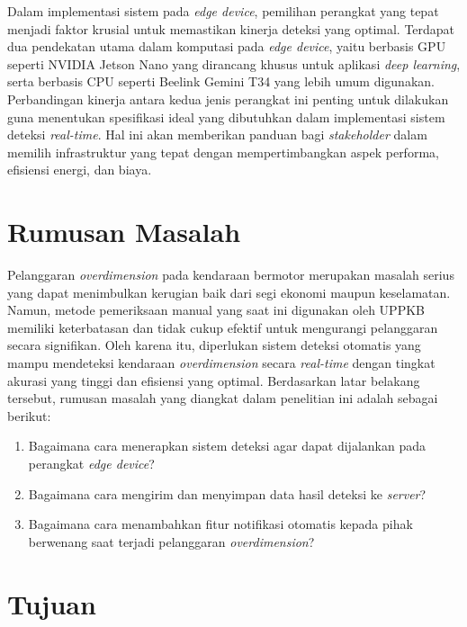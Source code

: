 Dalam implementasi sistem pada \emph{edge device}, pemilihan perangkat yang tepat menjadi faktor krusial untuk memastikan kinerja deteksi yang optimal. Terdapat dua pendekatan utama dalam komputasi pada \emph{edge device}, yaitu berbasis GPU seperti NVIDIA Jetson Nano yang dirancang khusus untuk aplikasi \emph{deep learning}, serta berbasis CPU seperti Beelink Gemini T34 yang lebih umum digunakan. Perbandingan kinerja antara kedua jenis perangkat ini penting untuk dilakukan guna menentukan spesifikasi ideal yang dibutuhkan dalam implementasi sistem deteksi \emph{real-time}. Hal ini akan memberikan panduan bagi \emph{stakeholder} dalam memilih infrastruktur yang tepat dengan mempertimbangkan aspek performa, efisiensi energi, dan biaya.

\section{Rumusan Masalah}
\label{sec:rumusanmasalah}

Pelanggaran \emph{overdimension} pada kendaraan bermotor merupakan masalah serius yang dapat menimbulkan kerugian baik dari segi ekonomi maupun keselamatan. Namun, metode pemeriksaan manual yang saat ini digunakan oleh UPPKB memiliki keterbatasan dan tidak cukup efektif untuk mengurangi pelanggaran secara signifikan. Oleh karena itu, diperlukan sistem deteksi otomatis yang mampu mendeteksi kendaraan \emph{overdimension} secara \emph{real-time} dengan tingkat akurasi yang tinggi dan efisiensi yang optimal. Berdasarkan latar belakang tersebut, rumusan masalah yang diangkat dalam penelitian ini adalah sebagai berikut:

\begin{enumerate}[nolistsep]

  \item Bagaimana cara menerapkan sistem deteksi agar dapat dijalankan pada perangkat \emph{edge device}?
  
  \item Bagaimana cara mengirim dan menyimpan data hasil deteksi ke \emph{server}?
  
  \item Bagaimana cara menambahkan fitur notifikasi otomatis kepada pihak berwenang saat terjadi pelanggaran \emph{overdimension}?
  
\end{enumerate}

\section{Tujuan}
\label{sec:Tujuan}


